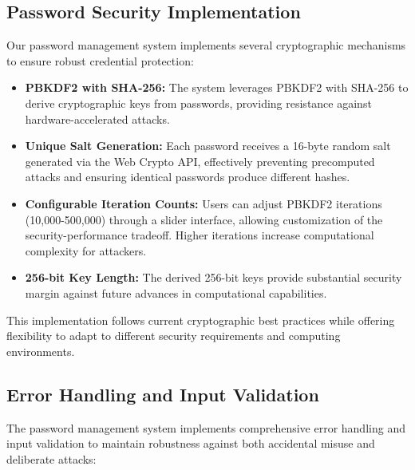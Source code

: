 \documentclass[11pt,a4paper]{article}
\begin{document}
\subsection{Password Security Implementation}
Our password management system implements several cryptographic mechanisms to ensure robust credential protection:
\begin{itemize}
  \item \textbf{PBKDF2 with SHA-256:} The system leverages PBKDF2 with SHA-256 to derive cryptographic keys from passwords, providing resistance against hardware-accelerated attacks.
  \item \textbf{Unique Salt Generation:} Each password receives a 16-byte random salt generated via the Web Crypto API, effectively preventing precomputed attacks and ensuring identical passwords produce different hashes.
  \item \textbf{Configurable Iteration Counts:} Users can adjust PBKDF2 iterations (10,000-500,000) through a slider interface, allowing customization of the security-performance tradeoff. Higher iterations increase computational complexity for attackers.
  \item \textbf{256-bit Key Length:} The derived 256-bit keys provide substantial security margin against future advances in computational capabilities.
\end{itemize}

This implementation follows current cryptographic best practices while offering flexibility to adapt to different security requirements and computing environments.

\subsection{Error Handling and Input Validation}

The password management system implements comprehensive error handling and input validation to maintain robustness against both accidental misuse and deliberate attacks:
\end{document}
